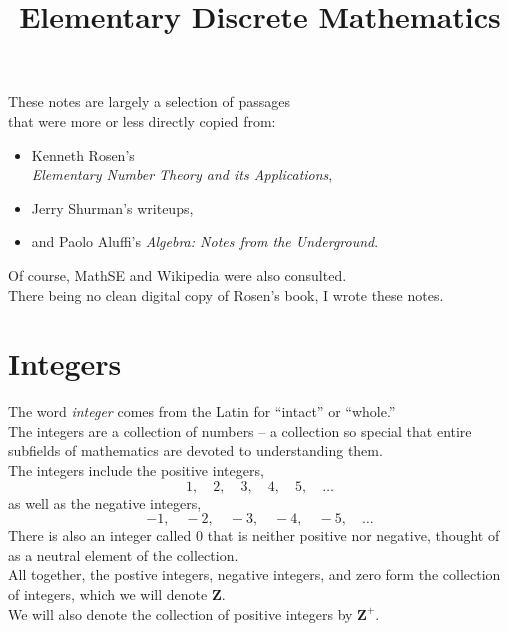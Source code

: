 \documentclass{amsbook}
\title{Elementary Discrete Mathematics}
\numberwithin{section}{chapter}
\theoremstyle{plain}
\theoremstyle{definition}
\def\br{~\\[1em]}
\def\ZZ{\mathbf Z}
\begin{document}
\maketitle
These notes are largely a selection of passages\\
that were
more or less directly
copied from:
\begin{itemize}
\item Kenneth Rosen's\\
\textsl{Elementary Number Theory and its Applications},
\item 
Jerry Shurman's writeups,
\item 
and Paolo Aluffi's \textsl{Algebra: Notes from the Underground}.
\end{itemize}
Of course, MathSE and Wikipedia were also consulted.
\br
There being no clean digital
copy of Rosen's book, I wrote these notes.
\tableofcontents
\chapter{Integers}
The word \textit{integer} comes from the Latin
for ``intact'' or ``whole.''
\br
The integers are a collection of numbers -- 
a collection so special that entire subfields of
mathematics are devoted to understanding them.
\br
The integers include the positive integers,
\[1,\quad 2,\quad 3,\quad 4,\quad 5,\quad\dots\]
as well as the negative integers,
\[-1,\quad -2,\quad -3,\quad -4,\quad -5,\quad\dots\]
There is also an integer called 0 that
is neither positive nor negative,
thought of as a neutral element of the collection.
\br
All together, the postive integers, negative integers, and zero
form the collection of integers, which we will denote $\ZZ$.
\br
We will also
denote the collection of positive integers by $\ZZ^+$.
\end{document}
